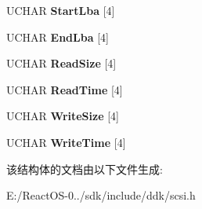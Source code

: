 \begin{DoxyCompactItemize}
\mbox{\label{struct___p_e_r_f_o_r_m_a_n_c_e___d_e_s_c_r_i_p_t_o_r_a749f4ec90252a031bd0b6d4052cec2b7}} 
U\+C\+H\+AR {\bfseries Start\+Lba} \mbox{[}4\mbox{]}
\item 
\mbox{\label{struct___p_e_r_f_o_r_m_a_n_c_e___d_e_s_c_r_i_p_t_o_r_aeb18819c9b6401ecf8ab9dbfe2d77893}} 
U\+C\+H\+AR {\bfseries End\+Lba} \mbox{[}4\mbox{]}
\item 
\mbox{\label{struct___p_e_r_f_o_r_m_a_n_c_e___d_e_s_c_r_i_p_t_o_r_a87a2d013fce97019601eafb92a8e17d0}} 
U\+C\+H\+AR {\bfseries Read\+Size} \mbox{[}4\mbox{]}
\item 
\mbox{\label{struct___p_e_r_f_o_r_m_a_n_c_e___d_e_s_c_r_i_p_t_o_r_ab1934f83df23a9799c5d9b1a8ee84383}} 
U\+C\+H\+AR {\bfseries Read\+Time} \mbox{[}4\mbox{]}
\item 
\mbox{\label{struct___p_e_r_f_o_r_m_a_n_c_e___d_e_s_c_r_i_p_t_o_r_a36ce7900e6b0ef3706f90bbd1f024882}} 
U\+C\+H\+AR {\bfseries Write\+Size} \mbox{[}4\mbox{]}
\item 
\mbox{\label{struct___p_e_r_f_o_r_m_a_n_c_e___d_e_s_c_r_i_p_t_o_r_a5b1d858688848d4421b31236817485c7}} 
U\+C\+H\+AR {\bfseries Write\+Time} \mbox{[}4\mbox{]}
\end{DoxyCompactItemize}


该结构体的文档由以下文件生成\+:\begin{DoxyCompactItemize}
\item 
E\+:/\+React\+O\+S-\/0../sdk/include/ddk/scsi.\+h\end{DoxyCompactItemize}
